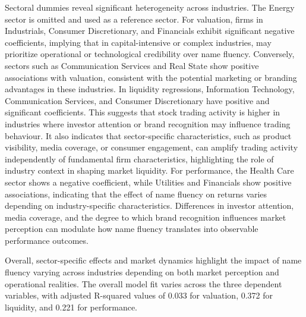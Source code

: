 \documentclass[a4paper,11pt]{report}
\begin{document}
Sectoral dummies reveal significant heterogeneity across industries. The Energy sector is omitted and used as a reference sector. For valuation, firms in Industrials, Consumer Discretionary, and Financials exhibit significant negative coefficients, implying that in capital-intensive or complex industries, may prioritize operational or technological credibility over name fluency. Conversely, sectors such as Communication Services and Real State show positive associations with valuation, consistent with the potential marketing or branding advantages in these industries. In liquidity regressions, Information Technology, Communication Services, and Consumer Discretionary have positive and significant coefficients. This suggests that stock trading activity is higher in industries where investor attention or brand recognition may influence trading behaviour. It also indicates that sector-specific characteristics, such as product visibility, media coverage, or consumer engagement, can amplify trading activity independently of fundamental firm characteristics, highlighting the role of industry context in shaping market liquidity. For performance, the Health Care sector shows a negative coefficient, while Utilities and Financials show positive associations, indicating that the effect of name fluency on returns varies depending on industry-specific characteristics. Differences in investor attention, media coverage, and the degree to which brand recognition influences market perception can modulate how name fluency translates into observable performance outcomes.

Overall, sector-specific effects and market dynamics highlight the impact of name fluency varying across industries depending on both market perception and operational realities. The overall model fit varies across the three dependent variables, with adjusted R-squared values of 0.033 for valuation, 0.372 for liquidity, and 0.221 for performance. 
\end{document}
